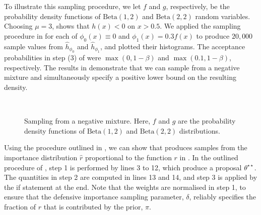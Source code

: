 \documentclass[review]{siamonline190516}
\begin{document}
To illustrate this sampling procedure, we let $f$ and $g$, respectively, be the probability density functions of $\mathrm{Beta}(1,2)$ and $\mathrm{Beta}(2,2)$ random variables.
Choosing $\mu = 3$,  shows that $h(x)<0$ on $x>0.5$.
We applied the sampling procedure in  for each of $\phi_0(x) \equiv 0$ and $\phi_1(x) = 0.3f(x)$ to produce $20,000$ sample values from $\hat h_{\phi_0}$ and $\hat h_{\phi_1}$, and plotted their histograms.
The acceptance probabilities in step (3) of  were $\max(0, 1-\beta)$ and $\max(0.1, 1 - \beta)$, respectively.
The results in  demonstrate that we can sample from a negative mixture and simultaneously specify a positive lower bound on the resulting density.

\begin{figure}
    \centering
    ~
    \caption{Sampling from a negative mixture. Here, $f$ and $g$ are the probability density functions of $\mathrm{Beta}(1,2)$ and $\mathrm{Beta}(2,2)$ distributions.}
    \label{fig:negative_mixture}
\end{figure}

Using the procedure outlined in , we can show that  produces samples from the importance distribution $\hat r$ proportional to the function $r$ in .
In the outlined procedure of , step 1 is performed by lines 3 to 12, which produce a proposal $\theta^{\star \star}$.
The quantities in step 2 are computed in lines 13 and 14, and step 3 is applied by the if statement at the end.
Note that the weights are normalised in step 1, to ensure that the defensive importance sampling parameter, $\delta$, reliably specifies the fraction of $r$ that is contributed by the prior, $\pi$.
\end{document}

